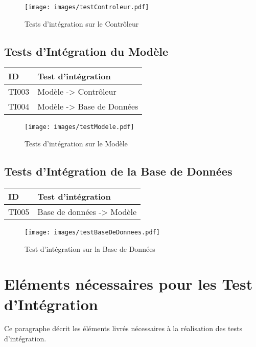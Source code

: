   \begin{figure}[H]
  	\centering
  	\texttt{[image: images/testControleur.pdf]}
  	\caption{Tests d'intégration sur le Contrôleur}
  	\label{testControleur}
  \end{figure}
  
  
 \subsection*{Tests d'Intégration du Modèle}
  \begin{center}
    \begin{tabular}[h]{|p{}|p{}|}
	\hline
	ID & Test d'intégration \\\hline
        TI003 & Modèle -> Contrôleur\\\hline
        TI004 & Modèle -> Base de Données \\\hline
     \end{tabular}
  \end{center}
  
  \begin{figure}[H]
  	\centering
  	\texttt{[image: images/testModele.pdf]}
  	\caption{Tests d'intégration sur le Modèle}
  	\label{testModele}
  \end{figure}    
  
  
  \subsection*{Tests d'Intégration de la Base de Données}
  \begin{center}
    \begin{tabular}[h]{|p{}|p{}|}
	\hline
	ID & Test d'intégration \\\hline
        TI005 & Base de données -> Modèle \\\hline
     \end{tabular}
  \end{center}
  
  \begin{figure}[H]
  	\centering
  	\texttt{[image: images/testBaseDeDonnees.pdf]}
  	\caption{Test d'intégration sur la Base de Données}
  	\label{testBaseDeDonnees}
  \end{figure}
  
  
  
  
  
  \section{Eléments nécessaires pour les Test d'Intégration}
  	Ce paragraphe décrit les éléments livrés nécessaires à la réalisation des tests d'intégration. \\
  	
